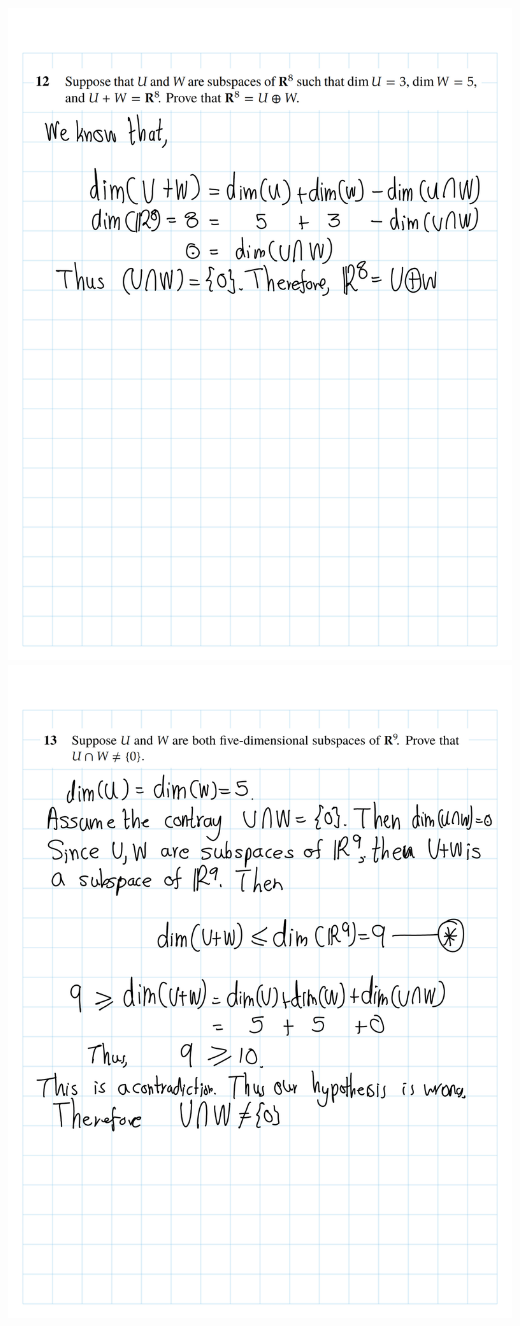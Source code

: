 \documentclass[
]{book}
\theoremstyle{definition}
\theoremstyle{definition}
\theoremstyle{definition}
\theoremstyle{definition}
\theoremstyle{remark}
\begin{document}
\includegraphics{fig/Ex 2B and 2C/Ex 2c (42).png}
\includegraphics{fig/Ex 2B and 2C/Ex 2c (43).png}
\end{document}
